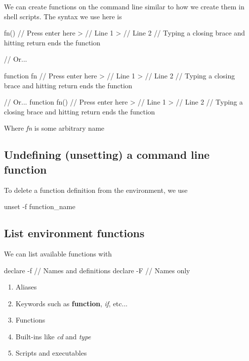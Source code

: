 \documentclass{report}
\begin{document}
    \pagebreak 
    \bigbreak \noindent 
    We can create functions on the command line similar to how we create them in shell scripts. The syntax we use here is 
    \bigbreak \noindent 
    \begin{bashcode}
        fn() { // Press enter here
            > // Line 1
            > // Line 2
        } // Typing a closing brace and hitting return ends the function

        // Or...

        function fn { // Press enter here
            > // Line 1
            > // Line 2
        } // Typing a closing brace and hitting return ends the function

        // Or...
        function fn() { // Press enter here
            > // Line 1
            > // Line 2
        } // Typing a closing brace and hitting return ends the function
    \end{bashcode}
    \bigbreak \noindent 
    Where \textit{fn} is some arbitrary name
    \bigbreak \noindent 
    \subsection{Undefining (unsetting) a command line function}
    \bigbreak \noindent 
    To delete a function definition from the environment, we use
    \bigbreak \noindent 
    \begin{bashcode}
    unset -f function_name
    \end{bashcode}

    \bigbreak \noindent 
    \subsection{List environment functions}
    \bigbreak \noindent 
    We can list available functions with
    \bigbreak \noindent 
    \begin{bashcode}
    declare -f // Names and definitions
    declare -F // Names only
    \end{bashcode}

    \pagebreak {}
    \bigbreak \noindent 
    \begin{enumerate}
        \item Aliases
        \item Keywords such as \textbf{function}, \textit{if}, etc...
        \item Functions
        \item Built-ins like \textit{cd} and \textit{type}
        \item Scripts and executables
    \end{enumerate}
\end{document}
